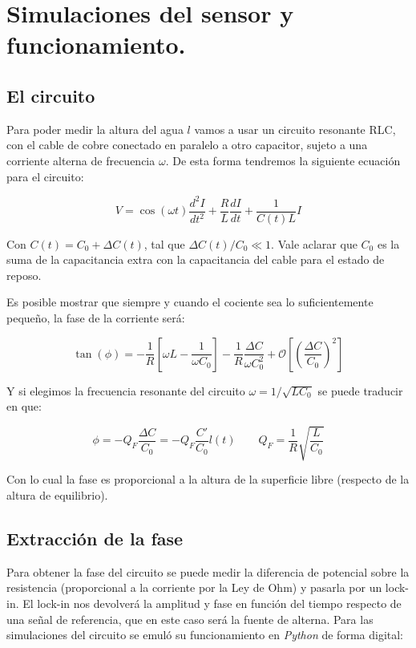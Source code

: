 \section{Simulaciones del sensor y funcionamiento.}
\subsection*{El circuito}
Para poder medir la altura del agua $l$ vamos a usar un circuito resonante RLC, con el cable de cobre conectado en paralelo a otro capacitor, sujeto a una corriente alterna de frecuencia $\omega$. De esta forma tendremos la siguiente ecuación para el circuito:

\begin{equation}
	V = \cos(\omega t)\frac{d^2I}{dt^2} + \frac{R}{L} \frac{dI}{dt} + \frac{1}{C(t)L} I
\end{equation}

Con $C(t) = C_0 + \Delta C(t)$, tal que $\Delta C(t)/C_0 \ll 1$. Vale aclarar que $C_0$ es la suma de la capacitancia extra con la capacitancia del cable para el estado de reposo.

Es posible mostrar que siempre y cuando el cociente sea lo suficientemente pequeño, la fase de la corriente será:

\begin{equation}
	\tan(\phi) = -\frac{1}{R} \left[\omega L - \frac{1}{\omega C_0}\right] - \frac{1}{R} \frac{\Delta C}{\omega C_0^2} + \mathcal{O}\left[\left(\frac{\Delta C}{C_0}\right)^2\right] 
\end{equation}

Y si elegimos la frecuencia resonante del circuito $\omega = 1/\sqrt{LC_0}$ se puede traducir en que:

\begin{equation}
	\phi = -Q_F  \frac{\Delta C}{C_0} = - Q_F \frac{C'}{C_0} l(t) \qquad Q_F = \frac{1}{R}\sqrt{\frac{L}{C_0}}
\end{equation}

Con lo cual la fase es proporcional a la altura de la superficie libre (respecto de la altura de equilibrio).

\subsection*{Extracción de la fase}
Para obtener la fase del circuito se puede medir la diferencia de potencial sobre la resistencia (proporcional a la corriente por la Ley de Ohm) y pasarla por un lock-in. El lock-in nos devolverá la amplitud y fase en función del tiempo respecto de una señal de referencia, que en este caso será la fuente de alterna. Para las simulaciones del circuito se emuló su funcionamiento en \textit{Python} de forma digital:

